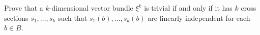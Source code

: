 Prove that a $k$-dimensional vector bundle $\xi^k$ is trivial if and only if it has $k$ cross sections $s_1, \ldots, s_k$ such that $s_1(b), \ldots, s_k(b)$ are linearly independent for each $b \in B$.